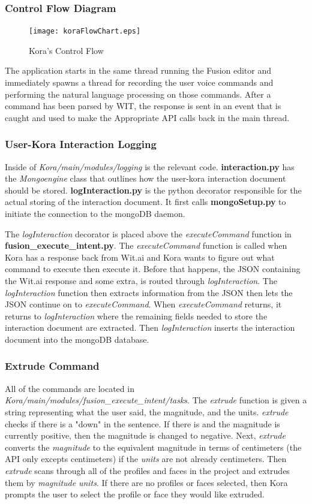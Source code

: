 \documentclass[onecolumn, draftclsnofoot,10pt, compsoc]{IEEEtran}
\begin{document}
\subsubsection{Control Flow Diagram}
	\begin{figure}[H]
		\texttt{[image: koraFlowChart.eps]}
		\centering
		\caption{Kora's Control Flow}
	\end{figure}
The application starts in the same thread running the Fusion editor and immediately spawns a thread for recording the user voice commands and performing the natural language processing on those commands.
After a command has been parsed by WIT, the response is sent in an event that is caught and used to make the Appropriate API calls back in the main thread.
	
\subsubsection{User-Kora Interaction Logging }
Inside of \textit{Kora/main/modules/logging} is the relevant code.
\textbf{interaction.py} has the \textit{Mongoengine} class that outlines how the user-kora interaction document should be stored. \textbf{logInteraction.py} is the python decorator responsible for the actual storing of the interaction document. It first calls \textbf{mongoSetup.py} to initiate the connection to the mongoDB daemon.

The \textit{logInteraction} decorator is placed above the \textit{executeCommand} function in \textbf{fusion\_execute\_intent.py}. The \textit{executeCommand} function is called when Kora has a response back from Wit.ai and Kora wants to figure out what command to execute then execute it. Before that happens, the JSON containing the Wit.ai response and some extra, is routed through \textit{logInteraction}. The \textit{logInteraction} function then extracts information from the JSON then lets the JSON continue on to \textit{executeCommand}. When \textit{executeCommand} returns, it returns to \textit{logInteraction} where the remaining fields needed to store the interaction document are extracted.
Then \textit{logInteraction} inserts the interaction document into the mongoDB database.

\subsubsection{Extrude Command}
All of the commands are located in \textit{Kora/main/modules/fusion\_execute\_intent/tasks}. The \textit{extrude} function is given a string representing what the user said, the magnitude, and the units.
\textit{extrude} checks if there is a "down" in the sentence. If there is and the magnitude is currently positive, then the magnitude is changed to negative. Next, \textit{extrude} converts the \textit{magnitude} to the equivalent magnitude in terms of centimeters (the API only excepts centimeters) if the \textit{units} are not already centimeters.
Then \textit{extrude} scans through all of the profiles and faces in the project and extrudes them by \textit{magnitude} \textit{units}. If there are no profiles or faces selected, then Kora prompts the user to select the profile or face they would like extruded.
\end{document}

